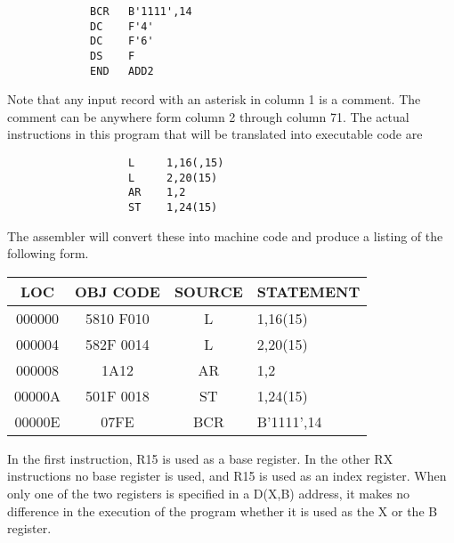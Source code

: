 \documentclass{report}
\begin{document}
\begin{itemize}
\begin{verbatim}
             BCR   B'1111',14
             DC    F'4'
             DC    F'6'
             DS    F
             END   ADD2
                    \end{verbatim}
                   Note that any input record with an asterisk in column 1 is a comment. The comment can be anywhere form column 2 through column 71. 
                   \bigbreak \noindent 
                   The actual instructions in this program that will be translated into executable code are
                   \bigbreak \noindent 
                   \begin{verbatim}
                   L     1,16(,15)
                   L     2,20(15)
                   AR    1,2
                   ST    1,24(15)
                   \end{verbatim}
                   \bigbreak \noindent 
                   The assembler will convert these into machine code and produce a listing of the following form.
                   \begin{center}
                       \begin{tabular}{|c|c|c|l|}
                           \hline
                           \textbf{LOC} & \textbf{OBJ CODE} & \textbf{SOURCE} & \textbf{STATEMENT} \\ \hline
                           000000       & 5810 F010         & L               & 1,16(15)           \\ \hline
                           000004       & 582F 0014         & L               & 2,20(15)           \\ \hline
                           000008       & 1A12              & AR              & 1,2                \\ \hline
                           00000A       & 501F 0018         & ST              & 1,24(15)           \\ \hline
                           00000E       & 07FE              & BCR             & B'1111',14         \\ \hline
                       \end{tabular}
                   \end{center}
                   \bigbreak \noindent 
                   In the first instruction, R15 is used as a base register. In the other RX instructions no base register is used, and R15 is used as an index register. When only one of the two registers is specified in a D(X,B) address, it makes no difference in the execution of the program whether it is used as the X or the B register.
                   \bigbreak \noindent 

\end{itemize}
\end{document}
